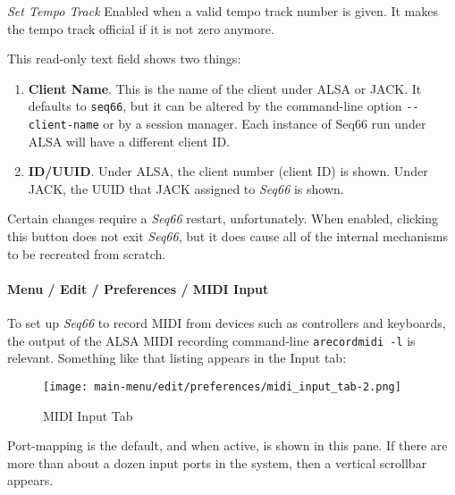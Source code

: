    \textsl{Set Tempo Track}
   Enabled when a valid tempo track number is given.
   It makes the tempo track official if it is not zero anymore.

   This read-only text field shows two things:

   \begin{enumerate}
      \item \textbf{Client Name}.
         This is the name of the client under ALSA or JACK.  It defaults to
         \texttt{seq66}, but it can be altered by the command-line option
         \texttt{-{}-client-name} or by a session manager.
         Each instance of Seq66 run under ALSA will have a different client ID.
      \item \textbf{ID/UUID}.
         Under ALSA, the client number (client ID) is shown.
         Under JACK, the UUID that JACK assigned to \textsl{Seq66} is shown.
   \end{enumerate}

   Certain changes require a \textsl{Seq66} restart, unfortunately.
   When enabled, clicking this button does not exit \textsl{Seq66},
   but it does cause all of the internal mechanisms to be recreated
   from scratch.


\paragraph{Menu / Edit / Preferences / MIDI Input}
\label{paragraph:menu_edit_preferences_midi_input}

   To set up \textsl{Seq66} to record MIDI from devices such as
   controllers and keyboards, the output of the ALSA MIDI recording
   command-line \texttt{arecordmidi -l} is relevant.
   Something like that listing appears in the Input tab:

\begin{figure}[H]
   \centering 
   \texttt{[image: main-menu/edit/preferences/midi\_input\_tab-2.png]}
   \caption{MIDI Input Tab}
   \label{fig:midi_input_tab}
\end{figure}

   Port-mapping is the default, and when active, is shown in this pane.
   If there are more than about a dozen
   input ports in the system, then a vertical scrollbar appears.

